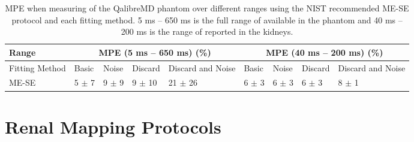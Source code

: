 \begin{table}[H]
	\centering
	\begin{adjustbox}{width=1.0\textwidth, center}
		\begin{tabularx}{1.3\textwidth}{X|X|X|X|X|X|X|X|X|X}
			\ttwo   Range    & \multicolumn{4}{c|}{MPE   (5 ms – 650 ms) (\%)}        & \multicolumn{5}{c}{MPE   (40 ms – 200 ms) (\%)}                           \\ \hline
			Fitting   Method & Basic     & Noise     & Discard    & Discard and Noise & \multicolumn{2}{l|}{Basic}     & Noise     & Discard  & Discard and Noise \\ \hline
			ME-SE            & 5 $\pm$ 7 & 9 $\pm$ 9 & 9 $\pm$ 10 & 21 $\pm$ 26       & \multicolumn{2}{l|}{6 $\pm$ 3} & 6 $\pm$ 3 & 6 $\pm$ 3 & 8 $\pm$ 1        \\
			
		\end{tabularx}
	\end{adjustbox}
	\caption{\ac{MPE} when measuring \ttwo of the QalibreMD phantom over different ranges using the \ac{NIST} recommended ME-SE protocol and  each fitting method. 5 ms – 650 ms is the full range of \ttwo available in the phantom and 40 ms – 200 ms is the range of \ttwo reported in the kidneys.}
	\label{tab:t2_phantom_fitting_methods_nist}
\end{table}

\section{Renal \ttwo Mapping Protocols}
\label{app:t2_fitting_renal}
